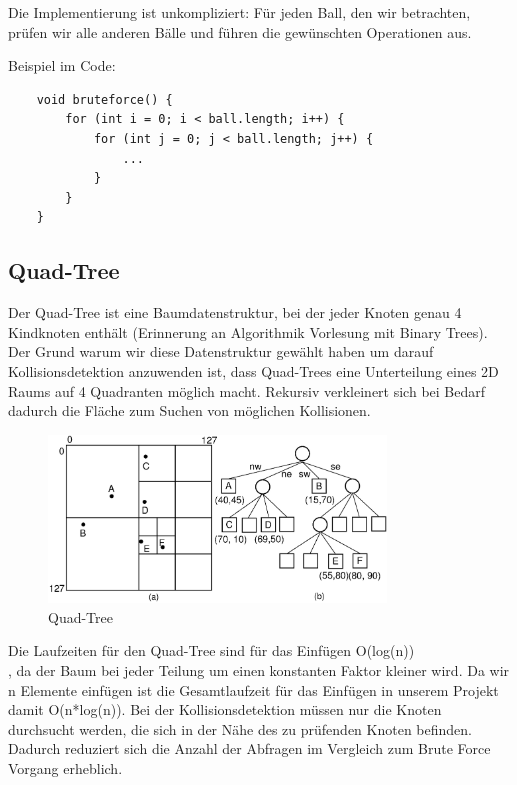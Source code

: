 \documentclass[12pt,a4paper]{article}
\begin{document}
Die Implementierung ist unkompliziert: Für jeden Ball, den wir betrachten, prüfen wir alle anderen Bälle und führen die gewünschten Operationen aus.

\vspace{0.5cm}
Beispiel im Code:

\begin{verbatim}
	void bruteforce() {
		for (int i = 0; i < ball.length; i++) {
			for (int j = 0; j < ball.length; j++) {
				...
			}
		}
	}
\end{verbatim}
	
	
	
	
	
	
	
	

	\subsection{Quad-Tree}
	Der Quad-Tree ist eine Baumdatenstruktur, bei der jeder Knoten genau 4 Kindknoten enthält (Erinnerung an Algorithmik Vorlesung mit Binary Trees). Der Grund warum wir diese Datenstruktur gewählt haben um darauf Kollisionsdetektion anzuwenden ist, dass Quad-Trees eine Unterteilung eines 2D Raums auf 4 Quadranten möglich macht. Rekursiv verkleinert sich bei Bedarf dadurch die Fläche zum Suchen von möglichen Kollisionen.
	\begin{figure}[H]
		\centering 
		\includegraphics[width=0.8\textwidth]{quadtree.png}  
		\caption{Quad-Tree  \cite{quadtree_example}} 
		\label{Bild: Beispiel Quadtree}  
	\end{figure}
	Die Laufzeiten für den Quad-Tree sind für das Einfügen O(log(n)) \cite{quadtree_source}~ \\, da der Baum bei jeder Teilung um einen konstanten Faktor kleiner wird. Da wir n Elemente einfügen ist die Gesamtlaufzeit für das Einfügen in unserem Projekt damit O(n*log(n)). 
	Bei der Kollisionsdetektion müssen nur die Knoten durchsucht werden, die sich in der Nähe des zu prüfenden Knoten befinden. Dadurch reduziert sich die Anzahl der Abfragen im Vergleich zum Brute Force Vorgang erheblich.
\end{document}
